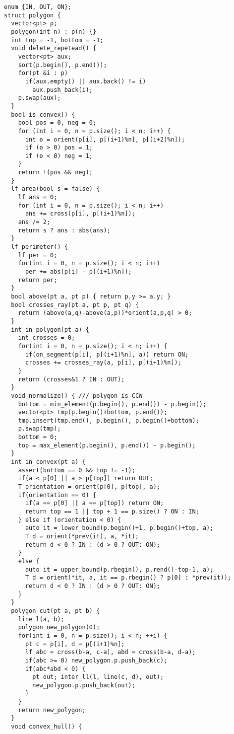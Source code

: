 \documentclass[10pt,letterpaper,twocolumn,twosided]{article}
\begin{document}
\begin{lstlisting}
enum {IN, OUT, ON};
struct polygon {
  vector<pt> p;
  polygon(int n) : p(n) {}
  int top = -1, bottom = -1;
  void delete_repetead() {
    vector<pt> aux;
    sort(p.begin(), p.end());
    for(pt &i : p)
      if(aux.empty() || aux.back() != i)
        aux.push_back(i);
    p.swap(aux);
  }
  bool is_convex() {
    bool pos = 0, neg = 0;
    for (int i = 0, n = p.size(); i < n; i++) {
      int o = orient(p[i], p[(i+1)%n], p[(i+2)%n]);
      if (o > 0) pos = 1;
      if (o < 0) neg = 1;
    }
    return !(pos && neg);
  }
  lf area(bool s = false) {
    lf ans = 0;
    for (int i = 0, n = p.size(); i < n; i++)
      ans += cross(p[i], p[(i+1)%n]);
    ans /= 2;
    return s ? ans : abs(ans);
  }
  lf perimeter() {
    lf per = 0;
    for(int i = 0, n = p.size(); i < n; i++)
      per += abs(p[i] - p[(i+1)%n]);
    return per;
  }
  bool above(pt a, pt p) { return p.y >= a.y; }
  bool crosses_ray(pt a, pt p, pt q) {
    return (above(a,q)-above(a,p))*orient(a,p,q) > 0;
  }
  int in_polygon(pt a) {
    int crosses = 0;
    for(int i = 0, n = p.size(); i < n; i++) {
      if(on_segment(p[i], p[(i+1)%n], a)) return ON;
      crosses += crosses_ray(a, p[i], p[(i+1)%n]);
    }
    return (crosses&1 ? IN : OUT);
  }
  void normalize() { /// polygon is CCW
    bottom = min_element(p.begin(), p.end()) - p.begin();
    vector<pt> tmp(p.begin()+bottom, p.end());
    tmp.insert(tmp.end(), p.begin(), p.begin()+bottom);
    p.swap(tmp);
    bottom = 0;
    top = max_element(p.begin(), p.end()) - p.begin();
  }
  int in_convex(pt a) {
    assert(bottom == 0 && top != -1);
    if(a < p[0] || a > p[top]) return OUT;
    T orientation = orient(p[0], p[top], a);
    if(orientation == 0) {
      if(a == p[0] || a == p[top]) return ON;
      return top == 1 || top + 1 == p.size() ? ON : IN;
    } else if (orientation < 0) {
      auto it = lower_bound(p.begin()+1, p.begin()+top, a);
      T d = orient(*prev(it), a, *it);
      return d < 0 ? IN : (d > 0 ? OUT: ON);
    }
    else {
      auto it = upper_bound(p.rbegin(), p.rend()-top-1, a);
      T d = orient(*it, a, it == p.rbegin() ? p[0] : *prev(it));
      return d < 0 ? IN : (d > 0 ? OUT: ON);
    }
  }
  polygon cut(pt a, pt b) {
    line l(a, b);
    polygon new_polygon(0);
    for(int i = 0, n = p.size(); i < n; ++i) {
      pt c = p[i], d = p[(i+1)%n];
      lf abc = cross(b-a, c-a), abd = cross(b-a, d-a);
      if(abc >= 0) new_polygon.p.push_back(c);
      if(abc*abd < 0) {
        pt out; inter_ll(l, line(c, d), out);
        new_polygon.p.push_back(out);
      }
    }
    return new_polygon;
  }
  void convex_hull() {

\end{lstlisting}
\end{document}
